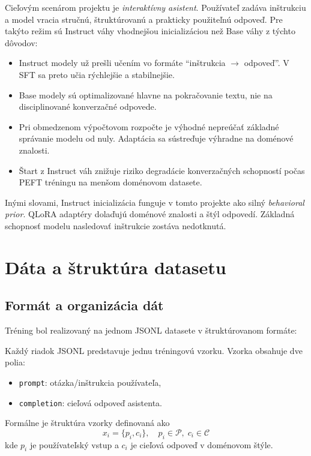 Cieľovým scenárom projektu je \textit{interaktívny asistent}. Používateľ zadáva inštrukciu a model vracia stručnú, štruktúrovanú a prakticky použiteľnú odpoveď. Pre takýto režim sú Instruct váhy vhodnejšou inicializáciou než Base váhy z týchto dôvodov:

\begin{itemize}
    \item Instruct modely už prešli učením vo formáte \enquote{inštrukcia $\rightarrow$ odpoveď}. V SFT sa preto učia rýchlejšie a stabilnejšie.
    \item Base modely sú optimalizované hlavne na pokračovanie textu, nie na disciplinované konverzačné odpovede.
    \item Pri obmedzenom výpočtovom rozpočte je výhodné nepreúčať základné správanie modelu od nuly. Adaptácia sa sústreďuje výhradne na doménové znalosti.
    \item Štart z Instruct váh znižuje riziko degradácie konverzačných schopností počas PEFT tréningu na menšom doménovom datasete.
\end{itemize}

Inými slovami, Instruct inicializácia funguje v tomto projekte ako silný \textit{behavioral prior}. QLoRA adaptéry dolaďujú doménové znalosti a štýl odpovedí. Základná schopnosť modelu nasledovať inštrukcie zostáva nedotknutá.

\section{Dáta a štruktúra datasetu}

\subsection{Formát a organizácia dát}

Tréning bol realizovaný na jednom JSONL datasete v štruktúrovanom formáte:

Každý riadok JSONL predstavuje jednu tréningovú vzorku. Vzorka obsahuje dve polia:
\begin{itemize}
    \item \texttt{prompt}: otázka/inštrukcia používateľa,
    \item \texttt{completion}: cieľová odpoveď asistenta.
\end{itemize}

Formálne je štruktúra vzorky definovaná ako
\begin{equation}
    x_i = \{p_i, c_i\}, \quad p_i \in \mathcal{P},\; c_i \in \mathcal{C}
\end{equation}
kde $p_i$ je používateľský vstup a $c_i$ je cieľová odpoveď v doménovom štýle.


